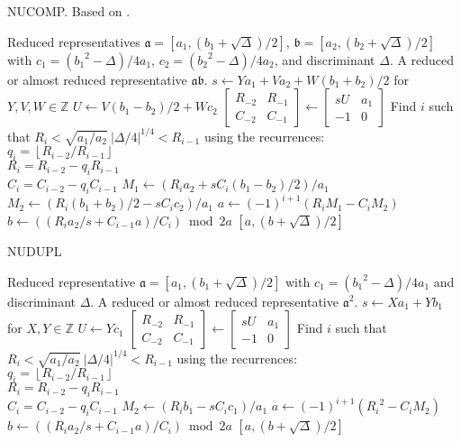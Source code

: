\documentclass{ucalgthes1}
\theoremstyle{plain}
\theoremstyle{definition}
\newcommand{\ZZ}{\mathbb{Z}}
\newcommand{\matrixtt}[4]{\left[ \begin{array}{rr} #1 & #2 \\ #3 & #4 \end{array} \right]}
\newcommand{\floor}[1]{\left\lfloor #1 \right\rfloor}
\begin{document}
\begin{comment}
\begin{algorithm}[h]
\caption{Is Ambiguous?}
\label{alg:ambiguous}
\begin{algorithmic}[1]
\REQUIRE A reduced representative $\mathfrak a = [a, (b+\sqrt\Delta)/2]$.
\ENSURE True if $\mathfrak a$ is ambiguous, False otherwise.
\IF {$a > 1$}
	\IF {$b = 0$ or $a = b$ or $a = c$}
		\RETURN True.
	\ENDIF
\ENDIF
\RETURN False.
\end{algorithmic}
\end{algorithm}
\end{comment}

\begin{algorithm}[h]
\caption{NUCOMP. Based on \cite[pp.441-443]{Jacobson2009}.}
\label{alg:nucomp}
\begin{algorithmic}[1]
\REQUIRE Reduced representatives $\mathfrak a = [a_1, (b_1+\sqrt\Delta)/2]$, $\mathfrak b = [a_2, (b_2+\sqrt\Delta)/2]$ with \break $c_1 = ({b_1}^2-\Delta)/4a_1$, $c_2 = ({b_2}^2-\Delta)/4a_2$, and discriminant $\Delta$.
\ENSURE A reduced or almost reduced representative $\mathfrak a \mathfrak b$.
\STATE $s \gets Ya_1 + Va_2 + W (b_1+b_2)/2$ for $Y, V, W \in \ZZ$
\STATE $U \gets V(b_1-b_2)/2 + Wc_2$
\STATE $\matrixtt{R_{-2}}{R_{-1}}{C_{-2}}{C_{-1}} \gets \matrixtt{sU}{a_1}{-1}{0}$
\STATE Find $i$ such that $R_i < \sqrt{a_1/a_2} ~ |\Delta/4|^{1/4} < R_{i-1}$ using the recurrences: \\
$q_i = \floor{R_{i-2}/R_{i-1}}$ \\
$R_i = R_{i-2}-q_i R_{i-1}$ \\
$C_i=C_{i-2}-q_i C_{i-1}$
\STATE $M_1 \gets (R_i a_2 + sC_i(b_1-b_2)/2)/a_1$
\STATE $M_2 \gets (R_i (b_1+b_2)/2 -sC_i c_2)/a_1$
\STATE $a \gets (-1)^{i+1}(R_i M_1 - C_i M_2)$
\STATE $b \gets ((R_i a_2/s + C_{i-1} a)/C_i) \bmod{2a}$
\RETURN $[a, (b+\sqrt\Delta)/2]$
\end{algorithmic}
\end{algorithm}

\begin{algorithm}[h]
\caption{NUDUPL}
\label{alg:nudupl}
\begin{algorithmic}[1]
\REQUIRE Reduced representative $\mathfrak a = [a_1, (b_1+\sqrt\Delta)/2]$ with $c_1 = ({b_1}^2-\Delta)/4a_1$ and discriminant $\Delta$.
\ENSURE A reduced or almost reduced representative $\mathfrak a^2$.
\STATE $s \gets Xa_1 + Yb_1$ for $X,Y \in \ZZ$
\STATE $U \gets Yc_1$
\STATE $\matrixtt{R_{-2}}{R_{-1}}{C_{-2}}{C_{-1}} \gets \matrixtt{sU}{a_1}{-1}{0}$
\STATE Find $i$ such that $R_i < \sqrt{a_1/a_2} ~ |\Delta/4|^{1/4} < R_{i-1}$ using the recurrences: \\
$q_i = \floor{R_{i-2}/R_{i-1}}$ \\
$R_i = R_{i-2}-q_i R_{i-1}$ \\
$C_i=C_{i-2}-q_i C_{i-1}$
\STATE $M_2 \gets (R_i b_1 -sC_i c_1)/a_1$
\STATE $a \gets (-1)^{i+1}({R_i}^2 - C_i M_2)$
\STATE $b \gets ((R_i a_2/s + C_{i-1} a)/C_i) \bmod{2a}$
\RETURN $[a, (b+\sqrt\Delta)/2]$
\end{algorithmic}
\end{algorithm}
\end{document}
